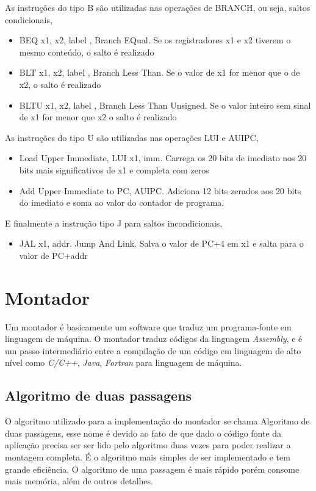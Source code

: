 		As instruções do tipo B são utilizadas nas operações de BRANCH, ou seja, saltos condicionais,
		\begin{itemize}
			\item{BEQ x1, x2, label , Branch EQual. Se os registradores x1 e x2 tiverem o mesmo conteúdo, o salto é realizado}
			\item{BLT x1, x2, label , Branch Less Than. Se o valor de x1 for menor que o de x2, o salto é realizado}
			\item{BLTU x1, x2, label , Branch Less Than Unsigned. Se o valor inteiro sem sinal de x1 for menor que x2 o salto é realizado }
		\end{itemize}

		As instruções do tipo U são utilizadas nas operações LUI e AUIPC,
		\begin{itemize}
			\item{Load Upper Immediate, LUI x1, imm. Carrega os 20 bits de imediato nos 20 bits mais significativos de x1 e completa com zeros}
			\item{Add Upper Immediate to PC, AUIPC. Adiciona 12 bits zerados aos 20 bits do imediato e soma ao valor do contador de programa.}
		\end{itemize}

		E finalmente a instrução tipo J para saltos incondicionais, 
		\begin{itemize}
			\item{JAL x1, addr. Jump And Link. Salva o valor de PC+4 em x1 e salta para o valor de PC+addr}
		\end{itemize}


\section{Montador}

	Um montador é basicamente um software que traduz um programa-fonte em linguagem de máquina. O montador traduz códigos da linguagem \textit{Assembly}, e é um passo intermediário entre a compilação de um código em linguagem de alto nível como \textit{C/C++}, \textit{Java}, \textit{Fortran} para linguagem de máquina.

	\subsection{Algoritmo de duas passagens}

		O algoritmo utilizado para a implementação do montador se chama Algoritmo de duas passagens, esse nome é devido ao fato de que dado o código fonte da aplicação precisa ser ser lido pelo algoritmo duas vezes para poder realizar a montagem completa. É o algoritmo mais simples de ser implementado e tem grande eficiência. O algoritmo de uma passagem é mais rápido porém consome mais memória, além de outros detalhes. 

